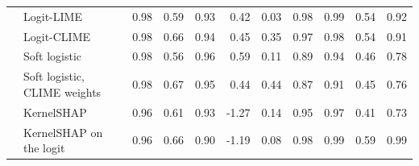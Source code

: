 \begin{tabular}{@{}llrrrrrrrrr@{}}
   & Logit-LIME & 0.98 & 0.59 & 0.93 & 0.42 & 0.03 & 0.98 & 0.99 & 0.54 & 0.92 \\
   & Logit-CLIME & 0.98 & 0.66 & 0.94 & 0.45 & 0.35 & 0.97 & 0.98 & 0.54 & 0.91 \\
   & Soft logistic & 0.98 & 0.56 & 0.96 & 0.59 & 0.11 & 0.89 & 0.94 & 0.46 & 0.78 \\
   & Soft logistic, CLIME weights & 0.98 & 0.67 & 0.95 & 0.44 & 0.44 & 0.87 & 0.91 & 0.45 & 0.76 \\
   & KernelSHAP & 0.96 & 0.61 & 0.93 & -1.27 & 0.14 & 0.95 & 0.97 & 0.41 & 0.73 \\
   & KernelSHAP on the logit & 0.96 & 0.66 & 0.90 & -1.19 & 0.08 & 0.98 & 0.99 & 0.59 & 0.99 \\
  \bottomrule
\end{tabular}
